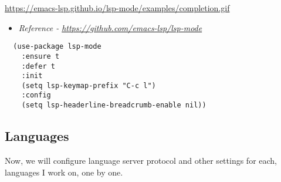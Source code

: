 \documentclass[11pt]{article}
\begin{document}
\url{https://emacs-lsp.github.io/lsp-mode/examples/completion.gif}

\begin{itemize}
\item \emph{Reference - \url{https://github.com/emacs-lsp/lsp-mode}}
\end{itemize}

\begin{verbatim}
  (use-package lsp-mode
    :ensure t
    :defer t
    :init
    (setq lsp-keymap-prefix "C-c l")
    :config
    (setq lsp-headerline-breadcrumb-enable nil))
\end{verbatim}
\subsection{Languages}
\label{sec:org95721aa}
Now, we will configure language server protocol and other settings for each,
languages I work on, one by one.
\end{document}
